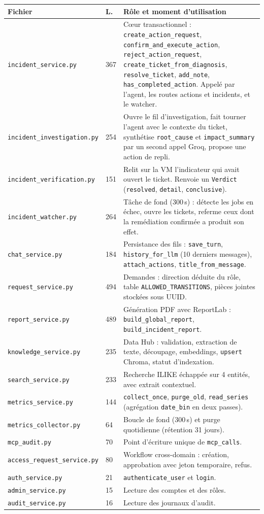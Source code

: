 \documentclass[11pt,a4paper]{report}
\newcommand{\file}[1]{\texttt{\small #1}}
\newcommand{\fn}[1]{\texttt{\small\textcolor{oasisviolet}{#1}}}
\newcommand{\cls}[1]{\texttt{\small\textcolor{oasisblue}{#1}}}
\newcommand{\tbl}[1]{\texttt{\small\textcolor{oasisamber}{#1}}}
\begin{document}
\begin{longtable}{@{}p{3.5cm}p{1.0cm}p{10.5cm}@{}}
\toprule
\textbf{Fichier} & \textbf{L.} & \textbf{Rôle et moment d'utilisation}\\
\midrule
\endhead
\file{incident\_service.py} & 367 & Cœur transactionnel : \fn{create\_action\_request}, \fn{confirm\_and\_execute\_action}, \fn{reject\_action\_request}, \fn{create\_ticket\_from\_diagnosis}, \fn{resolve\_ticket}, \fn{add\_note}, \fn{has\_completed\_action}. Appelé par l'agent, les routes actions et incidents, et le watcher.\\
\file{incident\_investigation.py} & 254 & Ouvre le fil d'investigation, fait tourner l'agent avec le contexte du ticket, synthétise \texttt{root\_cause} et \texttt{impact\_summary} par un second appel Groq, propose une action de repli.\\
\file{incident\_verification.py} & 151 & Relit sur la VM l'indicateur qui avait ouvert le ticket. Renvoie un \cls{Verdict} (\texttt{resolved}, \texttt{detail}, \texttt{conclusive}).\\
\file{incident\_watcher.py} & 264 & Tâche de fond (300\,s) : détecte les jobs en échec, ouvre les tickets, referme ceux dont la remédiation confirmée a produit son effet.\\
\file{chat\_service.py} & 184 & Persistance des fils : \fn{save\_turn}, \fn{history\_for\_llm} (10 derniers messages), \fn{attach\_actions}, \fn{title\_from\_message}.\\
\file{request\_service.py} & 494 & Demandes : direction déduite du rôle, table \fn{ALLOWED\_TRANSITIONS}, pièces jointes stockées sous UUID.\\
\file{report\_service.py} & 489 & Génération PDF avec ReportLab : \fn{build\_global\_report}, \fn{build\_incident\_report}.\\
\file{knowledge\_service.py} & 235 & Data Hub : validation, extraction de texte, découpage, embeddings, \texttt{upsert} Chroma, statut d'indexation.\\
\file{search\_service.py} & 233 & Recherche ILIKE échappée sur 4 entités, avec extrait contextuel.\\
\file{metrics\_service.py} & 144 & \fn{collect\_once}, \fn{purge\_old}, \fn{read\_series} (agrégation \texttt{date\_bin} en deux passes).\\
\file{metrics\_collector.py} & 64 & Boucle de fond (300\,s) et purge quotidienne (rétention 31 jours).\\
\file{mcp\_audit.py} & 70 & Point d'écriture unique de \tbl{mcp\_calls}.\\
\file{access\_request\_service.py} & 80 & Workflow cross-domain : création, approbation avec jeton temporaire, refus.\\
\file{auth\_service.py} & 21 & \fn{authenticate\_user} et \fn{login}.\\
\file{admin\_service.py} & 15 & Lecture des comptes et des rôles.\\
\file{audit\_service.py} & 16 & Lecture des journaux d'audit.\\
\bottomrule
\end{longtable}
\end{document}
